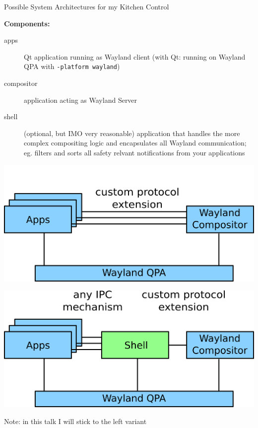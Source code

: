 \documentclass[ucs,9pt]{beamer}
\begin{document}
\begin{frame}
    {Possible System Architectures for my Kitchen Control}

    \textbf{Components:}
    \begin{description}
        \item [apps] Qt application running as Wayland client (with Qt: running on Wayland QPA with {\tt -platform wayland})
        \item [compositor] application acting as Wayland Server
        \item [shell] (optional, but IMO very reasonable) application that handles the more complex compositing logic and encapsulates all Wayland communication; eg. filters and sorts all safety relvant notifications from your applications
    \end{description}
    \medskip

    \begin{multicols}{2}
        \includegraphics[width=\linewidth]{architecture.png}
        \columnbreak

        \includegraphics[width=\linewidth]{architecture-shell.png}
    \end{multicols}

    Note: in this talk I will stick to the left variant
\end{frame}
\end{document}
